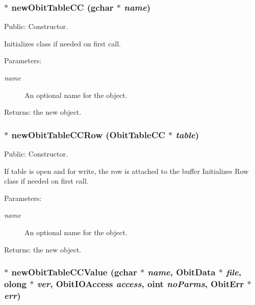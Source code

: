 \subsubsection{$\ast$ new\-Obit\-Table\-CC (gchar $\ast$ {\em name})}\label{ObitTableCC_8c_a16}


Public: Constructor. 

Initializes class if needed on first call. \begin{Desc}
\item[Parameters:]
\begin{description}
\item[{\em name}]An optional name for the object. \end{description}
\end{Desc}
\begin{Desc}
\item[Returns:]the new object. \end{Desc}
\subsubsection{$\ast$ new\-Obit\-Table\-CCRow ({\bf Obit\-Table\-CC} $\ast$ {\em table})}\label{ObitTableCC_8c_a14}


Public: Constructor. 

If table is open and for write, the row is attached to the buffer Initializes Row class if needed on first call. \begin{Desc}
\item[Parameters:]
\begin{description}
\item[{\em name}]An optional name for the object. \end{description}
\end{Desc}
\begin{Desc}
\item[Returns:]the new object. \end{Desc}
\subsubsection{$\ast$ new\-Obit\-Table\-CCValue (gchar $\ast$ {\em name}, {\bf Obit\-Data} $\ast$ {\em file}, {\bf olong} $\ast$ {\em ver}, Obit\-IOAccess {\em access}, {\bf oint} {\em no\-Parms}, {\bf Obit\-Err} $\ast$ {\em err})}\label{ObitTableCC_8c_a18}


